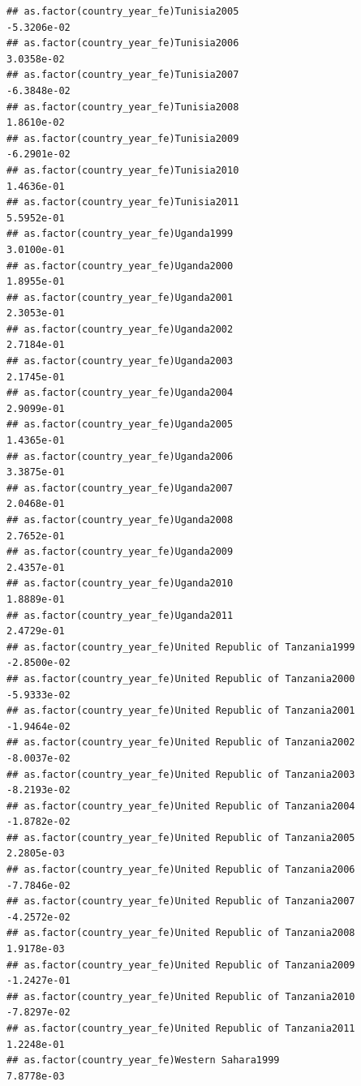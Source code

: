 \documentclass[
  a4paper,
]{article}
\begin{document}
\begin{verbatim}
## as.factor(country_year_fe)Tunisia2005                          -5.3206e-02
## as.factor(country_year_fe)Tunisia2006                           3.0358e-02
## as.factor(country_year_fe)Tunisia2007                          -6.3848e-02
## as.factor(country_year_fe)Tunisia2008                           1.8610e-02
## as.factor(country_year_fe)Tunisia2009                          -6.2901e-02
## as.factor(country_year_fe)Tunisia2010                           1.4636e-01
## as.factor(country_year_fe)Tunisia2011                           5.5952e-01
## as.factor(country_year_fe)Uganda1999                            3.0100e-01
## as.factor(country_year_fe)Uganda2000                            1.8955e-01
## as.factor(country_year_fe)Uganda2001                            2.3053e-01
## as.factor(country_year_fe)Uganda2002                            2.7184e-01
## as.factor(country_year_fe)Uganda2003                            2.1745e-01
## as.factor(country_year_fe)Uganda2004                            2.9099e-01
## as.factor(country_year_fe)Uganda2005                            1.4365e-01
## as.factor(country_year_fe)Uganda2006                            3.3875e-01
## as.factor(country_year_fe)Uganda2007                            2.0468e-01
## as.factor(country_year_fe)Uganda2008                            2.7652e-01
## as.factor(country_year_fe)Uganda2009                            2.4357e-01
## as.factor(country_year_fe)Uganda2010                            1.8889e-01
## as.factor(country_year_fe)Uganda2011                            2.4729e-01
## as.factor(country_year_fe)United Republic of Tanzania1999      -2.8500e-02
## as.factor(country_year_fe)United Republic of Tanzania2000      -5.9333e-02
## as.factor(country_year_fe)United Republic of Tanzania2001      -1.9464e-02
## as.factor(country_year_fe)United Republic of Tanzania2002      -8.0037e-02
## as.factor(country_year_fe)United Republic of Tanzania2003      -8.2193e-02
## as.factor(country_year_fe)United Republic of Tanzania2004      -1.8782e-02
## as.factor(country_year_fe)United Republic of Tanzania2005       2.2805e-03
## as.factor(country_year_fe)United Republic of Tanzania2006      -7.7846e-02
## as.factor(country_year_fe)United Republic of Tanzania2007      -4.2572e-02
## as.factor(country_year_fe)United Republic of Tanzania2008       1.9178e-03
## as.factor(country_year_fe)United Republic of Tanzania2009      -1.2427e-01
## as.factor(country_year_fe)United Republic of Tanzania2010      -7.8297e-02
## as.factor(country_year_fe)United Republic of Tanzania2011       1.2248e-01
## as.factor(country_year_fe)Western Sahara1999                    7.8778e-03

\end{verbatim}
\end{document}
